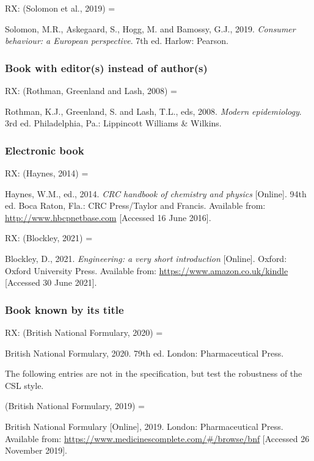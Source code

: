 RX: (Solomon et al., 2019) = \cite{solomon.etal2019cbe}

Solomon, M.R., Askegaard, S., Hogg, M. and Bamossy, G.J., 2019. \emph{Consumer behaviour: a European perspective}. 7th ed. Harlow: Pearson.



\subsubsection*{Book with editor(s) instead of author(s)}

RX: (Rothman, Greenland and Lash, 2008) = \cite{rothman.etal2008me}

Rothman, K.J., Greenland, S. and Lash, T.L., eds, 2008. \emph{Modern epidemiology}. 3rd ed. Philadelphia, Pa.: Lippincott Williams \& Wilkins.



\subsubsection*{Electronic book}

RX: (Haynes, 2014) = \cite{haynes2014crc}

Haynes, W.M., ed., 2014. \emph{CRC handbook of chemistry and physics} [Online]. 94th ed. Boca Raton, Fla.: CRC Press/Taylor and Francis. Available from: \url{http://www.hbcpnetbase.com} [Accessed 16 June 2016].


RX: (Blockley, 2021) = \cite{blockley2021evs}

Blockley, D., 2021. \emph{Engineering: a very short introduction} [Online]. Oxford: Oxford University Press. Available from: \url{https://www.amazon.co.uk/kindle} [Accessed 30 June 2021].



\subsubsection*{Book known by its title}

RX: (British National Formulary, 2020) = \cite{bnf2020}

British National Formulary, 2020. 79th ed. London: Pharmaceutical Press.


The following entries are not in the specification, but test the robustness of the CSL style.

(British National Formulary, 2019) = \cite{bnf2019online}

British National Formulary [Online], 2019. London: Pharmaceutical Press. Available from: \url{https://www.medicinescomplete.com/#/browse/bnf} [Accessed 26 November 2019].



